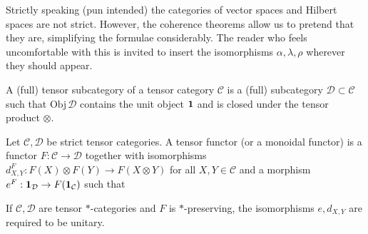 \documentclass[11pt]{article}
\theoremstyle{definition}
\theoremstyle{definition}
\theoremstyle{remark}
\newcommand{\Obj}{\mathrm{Obj}}
\def\2#1{{\mathcal #1}}
\def\1#1{{\bf #1}}
\newcommand{\rarr}{\rightarrow}
\def\id{\mathrm{id}}
\begin{document}
Strictly speaking (pun intended) the categories of vector spaces and Hilbert spaces are not strict. 
However, the coherence theorems allow us to pretend that they are, simplifying the formulae
considerably. The reader who feels uncomfortable with this is invited to insert the isomorphisms
$\alpha,\lambda,\rho$ wherever they should appear.
\erem

\bdefin {} 
A (full) tensor subcategory of a tensor category $\2C$ is a (full) subcategory
$\2D\subset\2C$ such that $\Obj\,\2D$ contains the unit object $\11$ and is closed under the tensor
product $\otimes$.
\edefin

\bdefin \label{def-mon-func}  
Let $\2C, \2D$ be strict tensor categories. A tensor functor (or a monoidal functor) is a functor
$F: \2C\rarr\2D$ together with isomorphisms $d^F_{X,Y}: F(X)\otimes F(Y)\rarr F(X\otimes Y)$ for all
$X,Y\in\2C$ and a morphism $e^F: \11_\2D\rarr F(\11_\2C)$ such that
If $\2C,\2D$ are tensor $*$-categories and $F$ is $*$-preserving, the isomorphisms $e, d_{X,Y}$ are 
required to be unitary. 
\edefin
\end{document}
